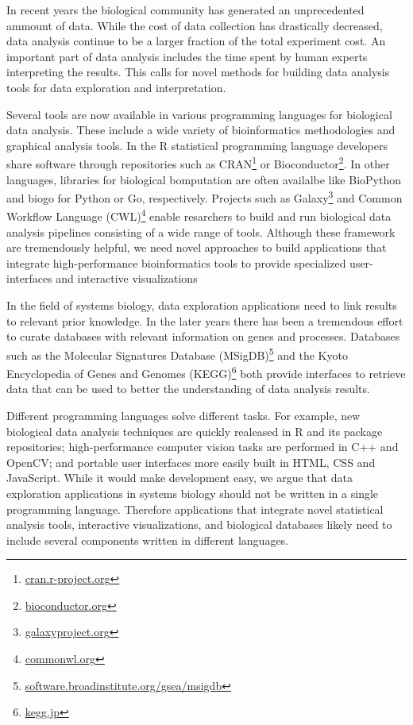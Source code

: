 In recent years the biological community has  generated  an
unprecedented ammount of data. While the cost of data collection has
drastically decreased, data analysis continue to be a larger fraction of the
total experiment cost.\cite{sboner2011real}  An important part of data analysis
includes the time spent by human experts interpreting the results. This calls
for novel methods for building data analysis tools for data exploration and
interpretation. 

Several tools are now available in various programming languages for biological
data analysis.  These include a wide variety of bioinformatics methodologies and
graphical analysis tools.
In the R statistical programming language developers share software through
repositories such as CRAN\footnote{\url{cran.r-project.org}} or
Bioconductor\footnote{\url{bioconductor.org}}.  In other languages, libraries
for biological bomputation are often availalbe like BioPython\cite{biopython}
and biogo\cite{biogo} for Python or Go, respectively. Projects such as
Galaxy\footnote{\url{galaxyproject.org}} and Common Workflow Language
(CWL)\footnote{\url{commonwl.org}} enable resarchers to build and run
biological data analysis pipelines consisting of a wide range of tools.
Although these framework are tremendously helpful, we need novel approaches to
build applications that integrate high-performance bioinformatics tools to
provide specialized user-interfaces and interactive visualizations

In the field of systems biology, data exploration applications need to link
results to relevant prior knowledge. In the later years there has been a
tremendous effort to curate databases with relevant information on genes and
processes. Databases such as the Molecular Signatures Database
(MSigDB)\footnote{\url{software.broadinstitute.org/gsea/msigdb}} and the Kyoto
Encyclopedia of Genes and Genomes (KEGG)\footnote{\url{kegg.jp}} both provide
interfaces to retrieve data that can be used to better the understanding of
data analysis results. 

Different programming languages solve different tasks.  For example, new
biological data analysis techniques are quickly realeased in R and its package
repositories; high-performance computer vision tasks are performed in C++ and
OpenCV; and portable user interfaces more easily built in HTML, CSS and
JavaScript.  While it would make development easy, we argue that data
exploration applications in systems biology should not be written in a single
programming language. Therefore applications that integrate novel statistical
analysis tools, interactive visualizations, and biological databases likely
need to include several components written in different languages. 

